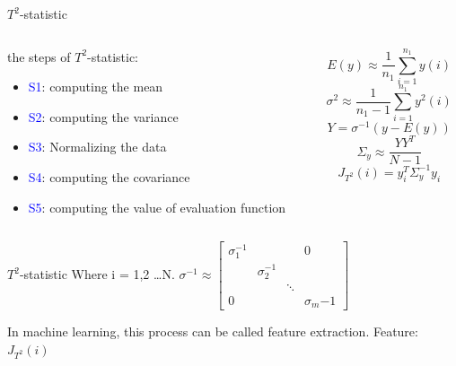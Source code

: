 \documentclass[10pt]{beamer}
\begin{document}
\begin{frame}{$T^2$-statistic}
    \begin{columns}
        \begin{column}{0.5\textwidth}
            the steps of $T^2$-statistic:
      \begin{itemize}
      \item \textcolor{blue}{S1}: computing the mean
      \item \textcolor{blue}{S2}: computing the variance
      \item \textcolor{blue}{S3}: Normalizing the data
      \item \textcolor{blue}{S4}: computing the  covariance
      \item \textcolor{blue}{S5}: computing the value of evaluation function
 	 \end{itemize}  
        \end{column}
        \begin{column}{0.5\textwidth}  %
               \begin{equation}
               E(y) \approx \frac{1}{n_1}\sum_{i=1}^{n_1}y(i) 
               \end{equation}
                \begin{equation}
                   \sigma^2 \approx \frac{1}{n_1-1}\sum_{i=1}^{n_1}y^2(i) 
                \end{equation}
                \begin{equation}
                Y = \sigma^{-1}(y-E(y))
                \end{equation}
                \begin{equation}
                \Sigma_y \approx \frac{YY^T}{N-1}
                \end{equation}
                \begin{equation}
                       J_{T^2}(i) = y_i^T\Sigma_y^{-1}y_i
                \end{equation}
        \end{column}
    \end{columns}
\end{frame}

\begin{frame}{$T^2$-statistic}
Where i = 1,2 \dots N. 
  $
                \sigma^{-1} \approx
                \begin{bmatrix}
                \sigma_1^{-1} &&&0\\
                &  \sigma_2^{-1} && \\
                && \ddots & \\
                0&&& \sigma_m{-1}
                \end{bmatrix}
  $ 
  \par
  In machine learning, this process can be called feature extraction.
  Feature:$ J_{T^2}(i)$
\end{frame}
\end{document}
